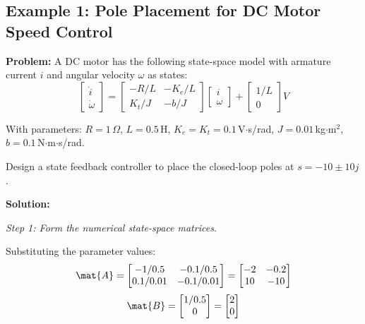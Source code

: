 \subsection{Example 1: Pole Placement for DC Motor Speed Control}

\textbf{Problem:} A DC motor has the following state-space model with armature current $i$ and angular velocity $\omega$ as states:
\begin{equation}
\begin{bmatrix} \dot{i} \\ \dot{\omega} \end{bmatrix} =
\begin{bmatrix} -R/L & -K_e/L \\ K_t/J & -b/J \end{bmatrix}
\begin{bmatrix} i \\ \omega \end{bmatrix} +
\begin{bmatrix} 1/L \\ 0 \end{bmatrix} V
\end{equation}

With parameters: $R = 1\,\Omega$, $L = 0.5\,$H, $K_e = K_t = 0.1\,$V$\cdot$s/rad, $J = 0.01\,$kg$\cdot$m$^2$, $b = 0.1\,$N$\cdot$m$\cdot$s/rad.

Design a state feedback controller to place the closed-loop poles at $s = -10 \pm 10j$.

\textbf{Solution:}

\textit{Step 1: Form the numerical state-space matrices.}

Substituting the parameter values:
\begin{equation}
\mat{A} = \begin{bmatrix} -1/0.5 & -0.1/0.5 \\ 0.1/0.01 & -0.1/0.01 \end{bmatrix}
= \begin{bmatrix} -2 & -0.2 \\ 10 & -10 \end{bmatrix}
\end{equation}
\begin{equation}
\mat{B} = \begin{bmatrix} 1/0.5 \\ 0 \end{bmatrix} = \begin{bmatrix} 2 \\ 0 \end{bmatrix}
\end{equation}

